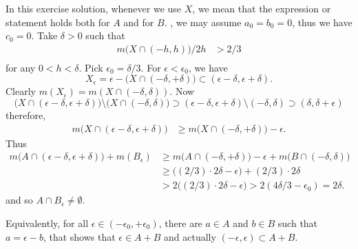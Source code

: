 \begin{enumerate}
In this exercise solution, whenever we use $X$, we mean that
the expression or statement holds both for $A$ and for $B$.
\Wlogy, we may assume \(a_0=b_0=0\),
thus we have \(c_0=0\).
Take \(\delta>0\) such that 
\begin{align*}
m\bigl(X\cap (-h,h)\bigr)/2h &> 2/3 \\ 
\end{align*}
for any \(0<h<\delta\).
Pick \(\epsilon_0 = \delta/3\).
For \(\epsilon < \epsilon_0\), we have
\begin{equation*}
X_\epsilon = \epsilon - \bigl(X \cap (-\delta,+\delta)\bigr)
\subset (\epsilon - \delta, \epsilon + \delta).
\end{equation*}
Clearly \(m(X_\epsilon) = m(X\cap(-\delta,\delta))\).
Now
\begin{equation*}
\bigl(X\cap(\epsilon-\delta,\epsilon+\delta)\bigr)
\setminus
\bigl(X\cap(-\delta,\delta)\bigr)
\supset 
(\epsilon-\delta,\epsilon+\delta) \setminus  (-\delta,\delta)
\supset (\delta,\delta + \epsilon)
\end{equation*}
therefore,
\begin{align*}
   m\bigl(X \cap (\epsilon-\delta, \epsilon+\delta)\bigr)
&\geq  m\bigl(X \cap (-\delta, +\delta)\bigr) - \epsilon.
\end{align*}
Thus
\begin{align*}
m\bigl(A \cap (\epsilon-\delta, \epsilon+\delta)\bigr) + m(B_\epsilon)
&\geq m\bigl(A \cap (-\delta, +\delta)\bigr) - \epsilon 
      + m\bigl(B\cap(-\delta,\delta)\bigr) \\
&\geq \bigl((2/3)\cdot2\delta - \epsilon\bigr) + (2/3)\cdot2\delta \\
&> 2\bigl((2/3)\cdot2\delta - \epsilon\bigr)
 > 2(4\delta/3 - \epsilon_0) = 2\delta.
\end{align*}
and so \(A\cap B_\epsilon \neq \emptyset\).

Equivalently, for all \(\epsilon\in(-\epsilon_0,+\epsilon_0)\), 
there are \(a\in A\) and \(b\in B\) such that \(a=\epsilon -b\),
that shows that \(\epsilon\in A+B\) and actually
\((-\epsilon,\epsilon) \subset A+B\).
 

\end{enumerate}
